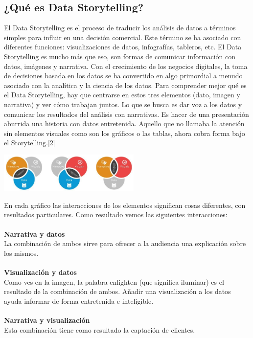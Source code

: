 \documentclass[twoside,twocolumn]{article}
\begin{document}
\subsection{¿Qué es Data Storytelling?} 
El Data Storytelling
 es el proceso de traducir los análisis de datos a 
 términos simples para influir en una decisión
  comercial. Este término se ha asociado con 
 diferentes funciones: visualizaciones de datos, 
 infografías, tableros, etc. El Data Storytelling 
 es mucho más que eso, son formas de comunicar 
 información con datos, imágenes y narrativa. Con 
 el crecimiento de los negocios digitales, la toma 
 de decisiones basada en los datos se ha convertido 
 en algo primordial a menudo asociado con la 
 analítica y la ciencia de los datos.
Para comprender mejor qué es el Data Storytelling, 
hay que centrarse en estos tres elementos (dato, 
imagen y narrativa) y ver cómo trabajan juntos. 
Lo que se busca es dar voz a los datos y comunicar 
los resultados del análisis con narrativas. 
Es hacer de una presentación aburrida una historia 
con datos entretenida. Aquello que no llamaba la 
atención sin elementos visuales como son los  
gráficos o las tablas, ahora cobra forma bajo 
el Storytelling.[2]
\begin{center}
	\includegraphics[width=7cm]{./imagenes/i2.png} 
\end{center}

En cada gráfico las interacciones de los elementos significan cosas diferentes, con resultados particulares. Como resultado vemos las siguientes interacciones:\\ \\
\textbf{ Narrativa y datos } 
\\La combinación de ambos sirve para ofrecer a la audiencia una explicación sobre los mismos.\\\\
\textbf{ Visualización y datos } 
\\Como ves en la imagen, la palabra enlighten (que significa iluminar) es el resultado de la combinación de ambos. Añadir una visualización a los datos ayuda informar de forma entretenida e inteligible.\\\\
\textbf{ Narrativa y visualización}
\\Esta combinación tiene como resultado la captación de clientes.\\ \\ 
\end{document}

